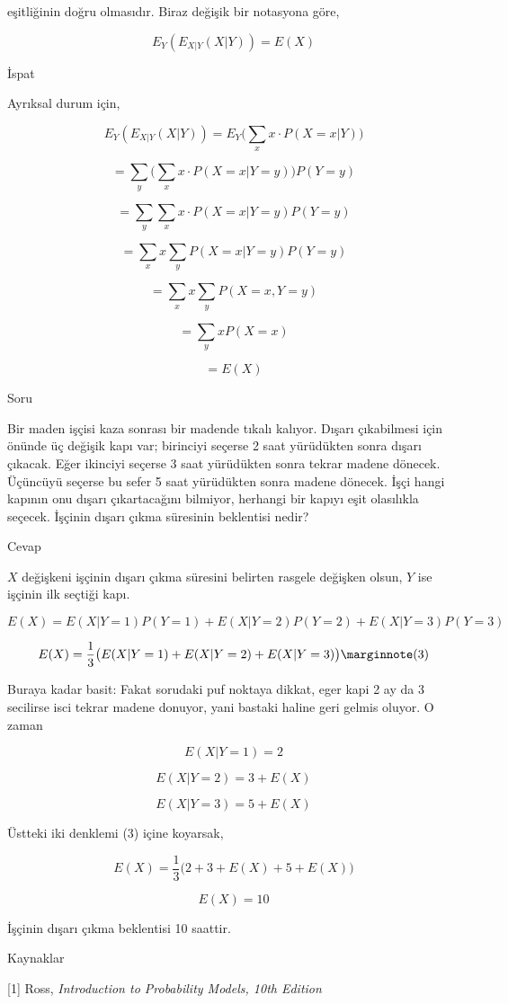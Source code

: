 \documentclass[12pt,fleqn]{article}\usepackage{../../common}
\begin{document}
eşitliğinin doğru olmasıdır. Biraz değişik bir notasyona göre,

$$ E_Y (E_{X|Y} (X|Y)) = E(X) $$

İspat

Ayrıksal durum için,

$$ E_Y (E_{X|Y} (X|Y)) = E_Y \bigg( \sum _{x} x \cdot P(X=x|Y) \bigg) $$

$$  = \sum_y \bigg( \sum _x x \cdot P(X=x|Y=y) \bigg) P(Y=y) $$

$$  = \sum_y  \sum _x x \cdot P(X=x|Y=y) P(Y=y) $$

$$  = \sum_x x \sum _y P(X=x|Y=y) P(Y=y) $$

$$  = \sum_x x \sum _y P(X=x,Y=y) $$

$$  = \sum_y x  P(X=x) $$

$$ = E(X) $$

Soru

Bir maden işçisi kaza sonrası bir madende tıkalı kalıyor. Dışarı çıkabilmesi
için önünde üç değişik kapı var; birinciyi seçerse 2 saat yürüdükten sonra
dışarı çıkacak. Eğer ikinciyi seçerse 3 saat yürüdükten sonra tekrar madene
dönecek. Üçüncüyü seçerse bu sefer 5 saat yürüdükten sonra madene dönecek. İşçi
hangi kapının onu dışarı çıkartacağını bilmiyor, herhangi bir kapıyı eşit
olasılıkla seçecek. İşçinin dışarı çıkma süresinin beklentisi nedir?

Cevap

$X$ değişkeni işçinin dışarı çıkma süresini belirten rasgele değişken olsun,
$Y$ ise işçinin ilk seçtiği kapı.

$$
E(X) = E(X | Y=1) P(Y=1) + E(X | Y=2) P(Y=2) +E(X | Y=3) P(Y=3) 
$$

$$
E(X) = \frac{1}{3} \big( E(X | Y=1)  + E(X | Y=2) +E(X | Y=3) \big)
\mlabel{3}
$$

Buraya kadar basit: Fakat sorudaki puf noktaya dikkat, eger kapi 2 ay da 3
secilirse isci tekrar madene donuyor, yani bastaki haline geri gelmis oluyor. O
zaman

$$ E(X|Y=1) = 2$$

$$ E(X|Y=2) = 3 + E(X) $$

$$ E(X|Y=3) = 5 + E(X) $$

Üstteki iki denklemi (3) içine koyarsak,

$$
E(X) = \frac{1}{3} \big( 2  + 3 + E(X) + 5 + E(X) \big)
$$

$$ E(X) = 10 $$

İşçinin dışarı çıkma beklentisi 10 saattir.

Kaynaklar

[1] Ross, {\em Introduction to Probability Models, 10th Edition}
\end{document}
